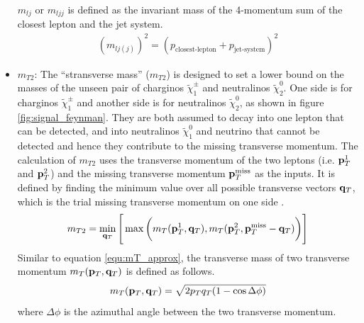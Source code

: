 \begin{itemize}
$m_{lj}$ or $m_{ljj}$ is defined as the invariant mass of the 4-momentum sum of the closest lepton and the jet system.
\begin{align}
(m_{lj(j)})^2 = (p_{\text{closest-lepton}} + p_{\text{jet-system}})^2
\end{align}

\item $m_{T2}$:
The ``stransverse mass'' ($m_{T2}$) is designed to set a lower bound on the masses of the unseen pair of charginos $\tilde{\chi}_1^\pm$ and neutralinos $\tilde{\chi}_2^0$.
One side is for charginos $\tilde{\chi}_1^\pm$ and another side is for neutralinos $\tilde{\chi}_2^0$, as shown in figure \ref{fig:signal_feynman}.
They are both assumed to decay into one lepton that can be detected, and into neutralinos $\tilde{\chi}_1^0$ and neutrino that cannot be detected and hence they contribute to the missing transverse momentum.
The calculation of $m_{T2}$ uses the transverse momentum of the two leptons (i.e. ${\bf p}_T^1$ and ${\bf p}_T^2$) and the missing transverse momentum ${\bf p}_T^{\text{miss}}$ as the inputs.
It is defined by finding the minimum value over all possible transverse vectors ${\bf q}_T$, which is the trial missing transverse momentum on one side \cite{MT2}.
\begin{equation}
m_{T2} = \min_{{\bf q}_T} \Bigg[ \max \bigg( m_T( {\bf p}_T^1, {\bf q}_T ), m_T( {\bf p}_T^2, {\bf p}_T^{\text{miss}} - {\bf q}_T ) \bigg) \Bigg]
\end{equation}
Similar to equation \ref{equ:mT_approx}, the transverse mass of two transverse momentum $m_T( {\bf p}_T, {\bf q}_T )$ is defined as follows.
\begin{equation}
m_T( {\bf p}_T, {\bf q}_T ) = \sqrt{ 2 p_T q_T ( 1 - \cos{\Delta\phi} ) }
\end{equation}
where $\Delta\phi$ is the azimuthal angle between the two transverse momentum.
\end{itemize}

